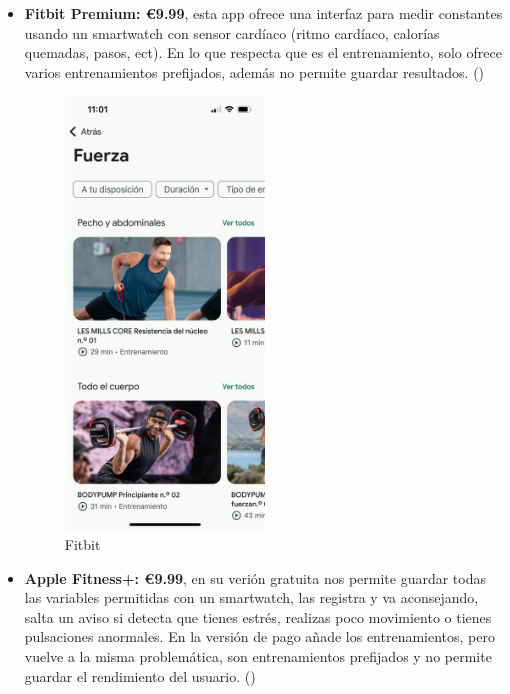 \begin{itemize}
	\item \textbf{Fitbit Premium: €9.99}, esta app ofrece una interfaz para medir constantes usando un smartwatch con sensor cardíaco (ritmo cardíaco, calorías quemadas, pasos, ect). En lo que respecta que es el entrenamiento, solo ofrece varios entrenamientos prefijados, además no permite guardar resultados. (\cite{fitbit})
\begin{figure}[H]
   \centering
    \includegraphics[width=0.5\textwidth]{fotos/fitbit.jpeg}
    \caption{Fitbit}
    \label{fig:Fitbit}
\end{figure} 
	\item \textbf{Apple Fitness+: €9.99}, en su verión gratuita nos permite guardar todas las variables permitidas con un smartwatch, las registra y va aconsejando, salta un aviso si detecta que tienes estrés, realizas poco movimiento o tienes pulsaciones anormales. En la versión de pago añade los entrenamientos, pero vuelve a la misma problemática, son entrenamientos prefijados y no permite guardar el rendimiento del usuario. (\cite{apple_fitness_plus})
\begin{figure}[H]
   \centering

\end{figure}
\end{itemize}
